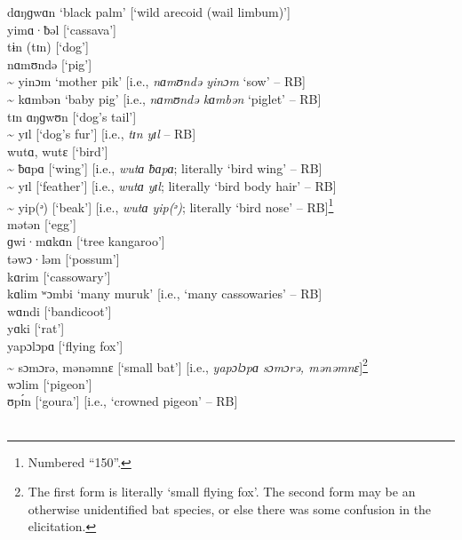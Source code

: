 \noindent dɑŋɡwɑn     ‘black palm’ [‘wild arecoid (wail limbum)’]\\
yimɑ·ƀəl     [‘cassava’]\\
tɨn (tɪn)     [‘dog’]\\
nɑmʊndə     [‘pig’]\\
{\textasciitilde} yinɔm     ‘mother pik’ [i.e., \textit{nɑmʊndə yinɔm} ‘sow’ -- RB]\\
{\textasciitilde} kɑmbən     ‘baby pig’ [i.e., \textit{nɑmʊndə kɑmbən} ‘piglet’ -- RB]\\
tɪn ɑŋɡwʊn  [‘dog’s tail’]\\
{\textasciitilde} yɪl      [‘dog’s fur’] [i.e., \textit{tɪn yɪl} -- RB]\\
wutɑ, wutɛ  [‘bird’]\\
{\textasciitilde} ƀɑpɑ      [‘wing’] [i.e., \textit{wutɑ ƀɑpɑ}; literally ‘bird wing’ -- RB]\\
{\textasciitilde} yɪl      [‘feather’] [i.e., \textit{wutɑ yɪl}; literally ‘bird body hair’ -- RB]\\
{\textasciitilde} yip(ᵊ)    [‘beak’] [i.e., \textit{wutɑ yip(ᵊ)}; literally ‘bird nose’ -- RB]\footnote{Numbered “150”.}\\
mətən       [‘egg’]\\
ɡwi·mɑkɑn   [‘tree kangaroo’]\\
təwɔ·ləm   [‘possum’]\\
kɑrim       [‘cassowary’]\\
kɑlim ʷɔmbi  ‘many muruk’ [i.e., ‘many cassowaries’ -- RB]\\
wɑndi       [‘bandicoot’]\\
yɑki       [‘rat’]\\
yapɔlɔpɑ     [‘flying fox’]\\
{\textasciitilde} sɔmɔrə, mənəmnɛ   [‘small bat’] [i.e., \textit{yapɔlɔpɑ sɔmɔrə, mənəmnɛ}]\footnote{The first form is literally ‘small flying fox’. The second form may be an otherwise unidentified bat species, or else there was some confusion in the elicitation.}\\
wɔlim       [‘pigeon’]\\
ʊpɪ́n       [‘goura’] [i.e., ‘crowned pigeon’ -- RB]\\

\\

